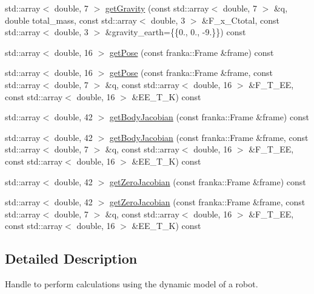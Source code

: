 \begin{DoxyCompactItemize}
\item 
std\+::array$<$ double, 7 $>$ \hyperlink{classfranka__hw_1_1_franka_model_handle_a832505472a8e7bc9e12f26a57eb659f8}{get\+Gravity} (const std\+::array$<$ double, 7 $>$ \&q, double total\+\_\+mass, const std\+::array$<$ double, 3 $>$ \&F\+\_\+x\+\_\+\+Ctotal, const std\+::array$<$ double, 3 $>$ \&gravity\+\_\+earth=\{\{0., 0., -\/9.\}\}) const
\item 
std\+::array$<$ double, 16 $>$ \hyperlink{classfranka__hw_1_1_franka_model_handle_af6617a4a3a89908c4a0aa8d25b2bfc07}{get\+Pose} (const franka\+::\+Frame \&frame) const
\item 
std\+::array$<$ double, 16 $>$ \hyperlink{classfranka__hw_1_1_franka_model_handle_aa5f4161223cf728ad3ca1bf48768df50}{get\+Pose} (const franka\+::\+Frame \&frame, const std\+::array$<$ double, 7 $>$ \&q, const std\+::array$<$ double, 16 $>$ \&F\+\_\+\+T\+\_\+\+EE, const std\+::array$<$ double, 16 $>$ \&E\+E\+\_\+\+T\+\_\+K) const
\item 
std\+::array$<$ double, 42 $>$ \hyperlink{classfranka__hw_1_1_franka_model_handle_adc7a47e0c49ab6c15be950f3a41df8c8}{get\+Body\+Jacobian} (const franka\+::\+Frame \&frame) const
\item 
std\+::array$<$ double, 42 $>$ \hyperlink{classfranka__hw_1_1_franka_model_handle_a1b5ba63881c0dc365590c6e116576704}{get\+Body\+Jacobian} (const franka\+::\+Frame \&frame, const std\+::array$<$ double, 7 $>$ \&q, const std\+::array$<$ double, 16 $>$ \&F\+\_\+\+T\+\_\+\+EE, const std\+::array$<$ double, 16 $>$ \&E\+E\+\_\+\+T\+\_\+K) const
\item 
std\+::array$<$ double, 42 $>$ \hyperlink{classfranka__hw_1_1_franka_model_handle_a09d1582af0e1a0e8dd156f612c06b7f6}{get\+Zero\+Jacobian} (const franka\+::\+Frame \&frame) const
\item 
std\+::array$<$ double, 42 $>$ \hyperlink{classfranka__hw_1_1_franka_model_handle_a5ce6ac6116ac3c45c923e5c2d515616c}{get\+Zero\+Jacobian} (const franka\+::\+Frame \&frame, const std\+::array$<$ double, 7 $>$ \&q, const std\+::array$<$ double, 16 $>$ \&F\+\_\+\+T\+\_\+\+EE, const std\+::array$<$ double, 16 $>$ \&E\+E\+\_\+\+T\+\_\+K) const
\end{DoxyCompactItemize}


\subsection{Detailed Description}
Handle to perform calculations using the dynamic model of a robot. 

